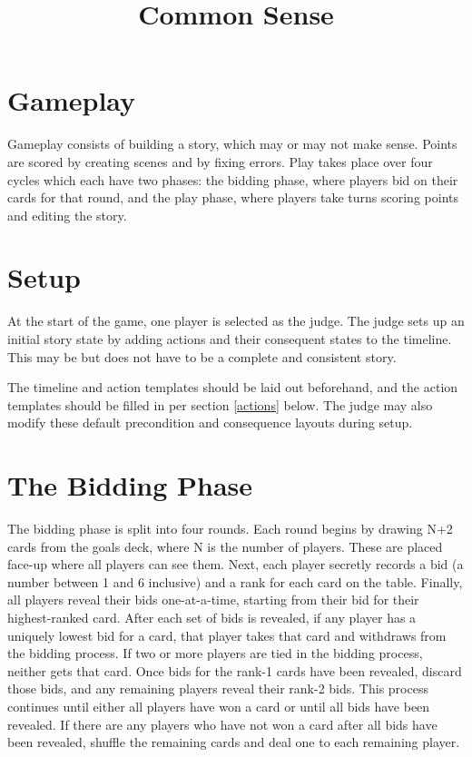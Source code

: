 \documentclass[12pt]{article}
\title{Common Sense}
\date{}
\begin{document}
\maketitle

\section{Gameplay}
%
Gameplay consists of building a story, which may or may not make sense.
%
Points are scored by creating scenes and by fixing errors.
%
Play takes place over four cycles which each have two phases: the bidding phase, where players bid on their cards for that round, and the play phase, where players take turns scoring points and editing the story.
%

\section{Setup}
%
At the start of the game, one player is selected as the judge.
%
The judge sets up an initial story state by adding actions and their consequent states to the timeline.
%
This may be but does not have to be a complete and consistent story.

The timeline and action templates should be laid out beforehand, and the action templates should be filled in per section \ref{actions} below.
%
The judge may also modify these default precondition and consequence layouts during setup.

\section{The Bidding Phase}
%
The bidding phase is split into four rounds.
%
Each round begins by drawing N+2 cards from the goals deck, where N is the number of players.
%
These are placed face-up where all players can see them.
%
Next, each player secretly records a bid (a number between 1 and 6 inclusive) and a rank for each card on the table.
%
Finally, all players reveal their bids one-at-a-time, starting from their bid for their highest-ranked card.
%
After each set of bids is revealed, if any player has a uniquely lowest bid for a card, that player takes that card and withdraws from the bidding process.
%
If two or more players are tied in the bidding process, neither gets that card.
%
Once bids for the rank-1 cards have been revealed, discard those bids, and any remaining players reveal their rank-2 bids.
%
This process continues until either all players have won a card or until all bids have been revealed.
%
If there are any players who have not won a card after all bids have been revealed, shuffle the remaining cards and deal one to each remaining player.
\end{document}
